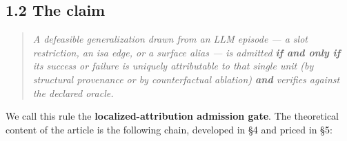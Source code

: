 \documentclass[11pt]{article}
\begin{document}
\subsection*{1.2 The claim}

\begin{quote}\itshape A defeasible generalization drawn from an LLM episode — a slot restriction, an \emph{isa} edge, or a surface alias — is admitted \textbf{if and only if} its success or failure is \emph{uniquely attributable} to that single unit (by structural provenance or by counterfactual ablation) \textbf{and} verifies against the declared oracle.\end{quote}

We call this rule the \textbf{localized-attribution admission gate}. The theoretical content of the article is the following chain, developed in §4 and priced in §5:
\end{document}
